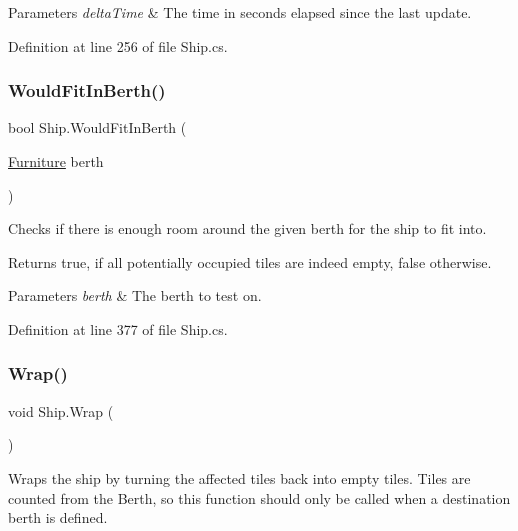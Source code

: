 \begin{DoxyParams}{Parameters}
{\em delta\+Time} & The time in seconds elapsed since the last update.\\
\hline
\end{DoxyParams}


Definition at line 256 of file Ship.\+cs.

\mbox{\label{class_ship_a073f1568ef8d9ea7d04867b0b6ee4888}} 
\subsubsection{\texorpdfstring{Would\+Fit\+In\+Berth()}{WouldFitInBerth()}}
{\footnotesize\ttfamily bool Ship.\+Would\+Fit\+In\+Berth (\begin{DoxyParamCaption}\item[{\hyperlink{class_furniture}{Furniture}}]{berth }\end{DoxyParamCaption})}



Checks if there is enough room around the given berth for the ship to fit into. 

\begin{DoxyReturn}{Returns}
{\ttfamily true}, if all potentially occupied tiles are indeed empty, {\ttfamily false} otherwise.
\end{DoxyReturn}

\begin{DoxyParams}{Parameters}
{\em berth} & The berth to test on.\\
\hline
\end{DoxyParams}


Definition at line 377 of file Ship.\+cs.

\mbox{\label{class_ship_ad0f53056aa94b27894bc9d8bb5601e16}} 
\subsubsection{\texorpdfstring{Wrap()}{Wrap()}}
{\footnotesize\ttfamily void Ship.\+Wrap (\begin{DoxyParamCaption}{ }\end{DoxyParamCaption})}



Wraps the ship by turning the affected tiles back into empty tiles. Tiles are counted from the Berth, so this function should only be called when a destination berth is defined. 



